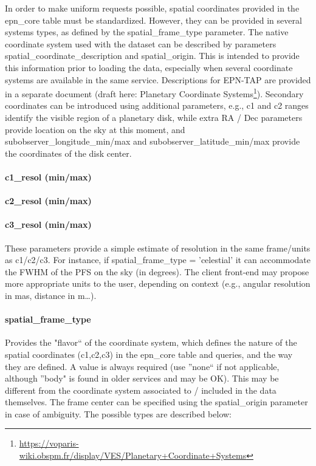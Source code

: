 \documentclass[11pt,a4paper]{ivoa}
\begin{document}
In order to make uniform requests possible, spatial coordinates provided in the epn\_core table must be standardized. However, they can be provided in several systems types, as defined by the spatial\_frame\_type parameter.  The native coordinate system used with the dataset can be described by parameters spatial\_coordinate\_description and spatial\_origin. This is intended to provide this information prior to loading the data, especially when several coordinate systems are available in the same service. Descriptions for EPN-TAP are provided in a separate document (draft here: Planetary Coordinate Systems\footnote{\url{https://voparis-wiki.obspm.fr/display/VES/Planetary+Coordinate+Systems}}). Secondary coordinates can be introduced using additional parameters, e.g., c1 and c2 ranges identify the visible region of a planetary disk, while extra RA / Dec parameters provide location on the sky at this moment, and subobserver\_longitude\_min/max and subobserver\_latitude\_min/max provide the coordinates of the disk center.

\paragraph{c1\_resol (min/max)}

\paragraph{c2\_resol (min/max)}

\paragraph{c3\_resol (min/max)}

These parameters provide a simple estimate of resolution in the same frame/units as c1/c2/c3. For instance, if spatial\_frame\_type = 'celestial' it can accommodate the FWHM of the PFS on the sky (in degrees). The client front-end may propose more appropriate units to the user, depending on context (e.g., angular resolution in mas, distance in m…).

\paragraph{spatial\_frame\_type}

Provides the "flavor`` of the coordinate system, which defines the nature of the spatial coordinates (c1,c2,c3) in the epn\_core table and queries, and the way they are defined. A value is always required (use ''none`` if not applicable, although ''body" is found in older services and may be OK). This may be different from the coordinate system associated to / included in the data themselves. The frame center can be specified using the spatial\_origin parameter in case of ambiguity. The possible types are described below:
\end{document}
